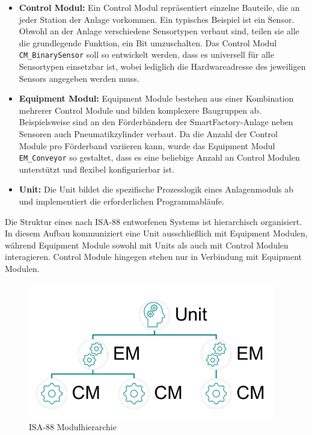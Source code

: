 \sloppy
\begin{itemize}
    \item \textbf{Control Modul:} Ein Control Modul repräsentiert einzelne Bauteile, die an jeder Station der Anlage
    vorkommen. Ein typisches Beispiel ist ein Sensor. Obwohl an der Anlage verschiedene Sensortypen verbaut sind, teilen 
    sie alle die grundlegende Funktion, ein Bit umzuschalten. Das Control Modul \texttt{CM\_BinarySensor} soll so entwickelt 
    werden, dass es universell für alle Sensortypen einsetzbar ist, wobei lediglich die Hardwareadresse des jeweiligen 
    Sensors angegeben werden muss.

    \item \textbf{Equipment Modul:} Equipment Module bestehen aus einer Kombination mehrerer Control Module und bilden 
    komplexere Baugruppen ab. Beispielsweise sind an den Förderbändern der SmartFactory-Anlage neben Sensoren auch 
    Pneumatikzylinder verbaut. Da die Anzahl der Control Module pro Förderband variieren kann, wurde das Equipment Modul 
    \texttt{EM\_Conveyor} so gestaltet, dass es eine beliebige Anzahl an Control Modulen unterstützt und flexibel 
    konfigurierbar ist.

    \item \textbf{Unit:} Die Unit bildet die spezifische Prozesslogik eines Anlagenmoduls ab und implementiert die 
    erforderlichen Programmabläufe.
\end{itemize}

Die Struktur eines nach ISA-88 entworfenen Systems ist hierarchisch organisiert. In diesem Aufbau kommuniziert eine Unit 
ausschließlich mit Equipment Modulen, während Equipment Module sowohl mit Units als auch mit Control Modulen interagieren. 
Control Module hingegen stehen nur in Verbindung mit Equipment Modulen.

\begin{figure}[h!]
    \centering
    \includegraphics*{figures/Screenshot 2025-01-03 201917.png}
    \caption{ISA-88 Modulhierarchie\cite{siemens2022}} %
    \label{fig:isa88-modulhierarchie} %
\end{figure}

